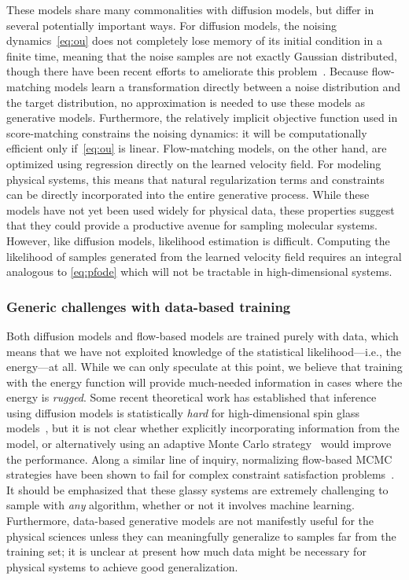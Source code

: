 \documentclass[11pt]{article}
\begin{document}
These models share many commonalities with diffusion models, but differ in several potentially important ways.
For diffusion models, the noising dynamics~\eqref{eq:ou} does not completely lose memory of its initial condition in a finite time, meaning that the noise samples are not exactly Gaussian distributed, though there have been recent efforts to ameliorate this problem~\cite{shi_diffusion_2023}.
Because flow-matching models learn a transformation directly between a noise distribution and the target distribution, no approximation is needed to use these models as generative models. 
Furthermore, the relatively implicit objective function used in score-matching constrains the noising dynamics: it will be computationally efficient only if~\eqref{eq:ou} is linear.
Flow-matching models, on the other hand, are optimized using regression directly on the learned velocity field. 
For modeling physical systems, this means that natural regularization terms and constraints can be directly incorporated into the entire generative process. 
While these models have not yet been used widely for physical data, these properties suggest that they could provide a productive avenue for sampling molecular systems. 
However, like diffusion models, likelihood estimation is difficult. 
Computing the likelihood of samples generated from the learned velocity field requires an integral analogous to \eqref{eq:pfode} which will not be tractable in high-dimensional systems.


\subsubsection{Generic challenges with data-based training}\label{sec:databased}

Both diffusion models and flow-based models are trained purely with data, which means that we have not exploited knowledge of the statistical likelihood---i.e., the energy---at all. 
While we can only speculate at this point, we believe that training with the energy function will provide much-needed information in cases where the energy is \emph{rugged}.
Some recent theoretical work has established that inference using diffusion models is statistically \emph{hard} for high-dimensional spin glass models~\cite{ghio_sampling_2023}, but it is not clear whether explicitly incorporating information from the model, or alternatively using an adaptive Monte Carlo strategy~\cite{gabrie_efficient_2021, gabrie_adaptive_2022} would improve the performance.
Along a similar line of inquiry, normalizing flow-based MCMC strategies have been shown to fail for complex constraint satisfaction problems~\cite{ciarella_machine-learning-assisted_2023}.
It should be emphasized that these glassy systems are extremely challenging to sample with \emph{any} algorithm, whether or not it involves machine learning.
Furthermore, data-based generative models are not manifestly useful for the physical sciences unless they can meaningfully generalize to samples far from the training set; it is unclear at present how much data might be necessary for physical systems to achieve good generalization.
\end{document}

